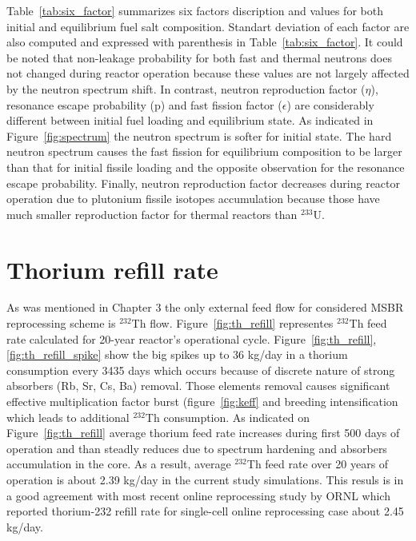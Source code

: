 Table~\ref{tab:six_factor} summarizes six factors discription and values for both initial and equilibrium fuel salt composition. Standart deviation of each factor are also computed and expressed with parenthesis in Table~\ref{tab:six_factor}. It could be noted that non-leakage probability for both fast and thermal neutrons does not changed during reactor operation because these values are not largely affected by the neutron spectrum shift. In contrast, neutron reproduction factor ($\eta$), resonance escape probability (p) and fast fission factor ($\epsilon$) are considerably different between initial fuel loading and equilibrium state. As indicated in Figure~\ref{fig:spectrum} the neutron spectrum is softer for initial state. The hard neutron spectrum causes the fast fission for equilibrium composition to be larger than that for initial fissile loading and the opposite observation for the resonance escape probability. Finally, neutron reproduction factor decreases during reactor operation due to plutonium fissile isotopes accumulation because those have much smaller reproduction factor for thermal reactors than $^{233}$U.

\section{Thorium refill rate}
As was mentioned in Chapter 3 the only external feed flow for considered \gls{MSBR} reprocessing scheme is $^{232}$Th flow. Figure~\ref{fig:th_refill} representes $^{232}$Th feed rate calculated for 20-year reactor's operational cycle. Figure~\ref{fig:th_refill}, \ref{fig:th_refill_spike} show the big spikes up to 36 kg/day in a thorium consumption every 3435 days which occurs because of discrete nature of strong absorbers (Rb, Sr, Cs, Ba) removal. Those elements removal causes significant effective multiplication factor burst (figure~\ref{fig:keff} and breeding intensification which leads to additional $^{232}$Th consumption. As indicated on Figure~\ref{fig:th_refill} average thorium feed rate increases during first 500 days of operation and than steadly reduces due to spectrum hardening and absorbers accumulation in the core. As a result, average $^{232}$Th feed rate over 20 years of operation is about 2.39 kg/day in the current study simulations. This resuls is in a good agreement with most recent online reprocessing study by \gls{ORNL} \cite{betzler_molten_2017} which reported thorium-232 refill rate for single-cell online reprocessing case about 2.45 kg/day.

